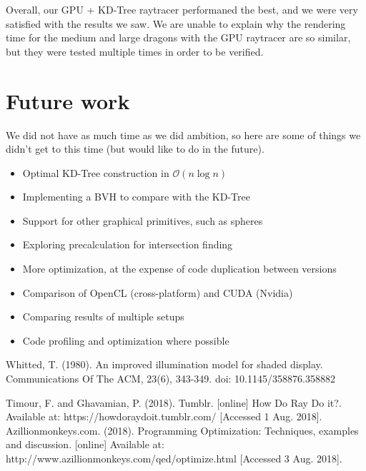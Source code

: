 \documentclass[letterpaper, 10 pt, conference]{ieeeconf}  %
\begin{document}
Overall, our GPU + KD-Tree raytracer performaned the best, and we were very satisfied with the results we saw. We are unable to explain why the rendering time for the medium and large dragons with the GPU raytracer are so similar, but they were tested multiple times in order to be verified.

\addtolength{\textheight}{-12cm}   %


\section*{Future work}
We did not have as much time as we did ambition, so here are some of things we didn't get to this time (but would like to do in the future).
\begin{itemize}
\item Optimal KD-Tree construction in $\mathcal{O}(n\log{n})$
\item Implementing a BVH to compare with the KD-Tree
\item Support for other graphical primitives, such as spheres
\item Exploring precalculation for intersection finding
\item More optimization, at the expense of code duplication between versions
\item Comparison of OpenCL (cross-platform) and CUDA (Nvidia)
\item Comparing results of multiple setups
\item Code profiling and optimization where possible
\end{itemize}






\begin{thebibliography}{99}

 Whitted, T. (1980). An improved illumination model for shaded display. Communications Of The ACM, 23(6), 343-349. doi: 10.1145/358876.358882

 Timour, F. and Ghavamian, P. (2018). Tumblr. [online] How Do Ray Do it?. Available at: https://howdoraydoit.tumblr.com/ [Accessed 1 Aug. 2018].
Azillionmonkeys.com. (2018). Programming Optimization: Techniques, examples and discussion. [online] Available at: http://www.azillionmonkeys.com/qed/optimize.html [Accessed 3 Aug. 2018].




\end{thebibliography}
\end{document}
